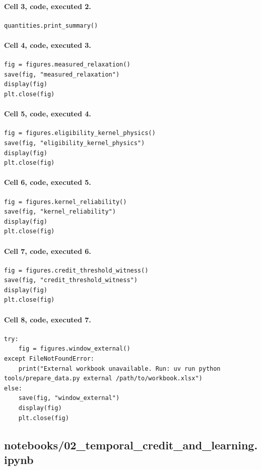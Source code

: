 \documentclass[a4paper,10pt]{article}
\begin{document}
\paragraph{Cell 3, code, executed 2.}
\begin{Verbatim}
quantities.print_summary()
\end{Verbatim}
\paragraph{Cell 4, code, executed 3.}
\begin{Verbatim}
fig = figures.measured_relaxation()
save(fig, "measured_relaxation")
display(fig)
plt.close(fig)
\end{Verbatim}
\paragraph{Cell 5, code, executed 4.}
\begin{Verbatim}
fig = figures.eligibility_kernel_physics()
save(fig, "eligibility_kernel_physics")
display(fig)
plt.close(fig)
\end{Verbatim}
\paragraph{Cell 6, code, executed 5.}
\begin{Verbatim}
fig = figures.kernel_reliability()
save(fig, "kernel_reliability")
display(fig)
plt.close(fig)
\end{Verbatim}
\paragraph{Cell 7, code, executed 6.}
\begin{Verbatim}
fig = figures.credit_threshold_witness()
save(fig, "credit_threshold_witness")
display(fig)
plt.close(fig)
\end{Verbatim}
\paragraph{Cell 8, code, executed 7.}
\begin{Verbatim}
try:
    fig = figures.window_external()
except FileNotFoundError:
    print("External workbook unavailable. Run: uv run python tools/prepare_data.py external /path/to/workbook.xlsx")
else:
    save(fig, "window_external")
    display(fig)
    plt.close(fig)
\end{Verbatim}
\subsection{notebooks/02\_temporal\_credit\_and\_learning.ipynb}
\end{document}
